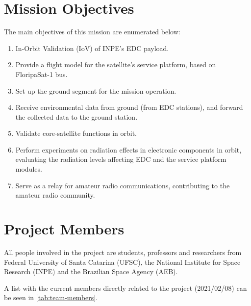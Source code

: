 
\section{Mission Objectives}

The main objectives of this mission are enumerated below:

\begin{enumerate}
    \item In-Orbit Validation (IoV) of INPE's EDC payload.
    \item Provide a flight model for the satellite's service platform, based on FloripaSat-1 bus.
    \item Set up the ground segment for the mission operation.
    \item Receive environmental data from ground (from EDC stations), and forward the collected data to the ground station.
    \item Validate core-satellite functions in orbit.
    \item Perform experiments on radiation effects in electronic components in orbit, evaluating the radiation levels affecting EDC and the service platform modules.
    \item Serve as a relay for amateur radio communications, contributing to the amateur radio community.
\end{enumerate}

\section{Project Members}

All people involved in the project are students, professors and researchers from Federal University of Santa Catarina (UFSC), the National Institute for Space Research (INPE) and the Brazilian Space Agency (AEB).

A list with the current members directly related to the project (2021/02/08) can be seen in \autoref{tab:team-members}.

